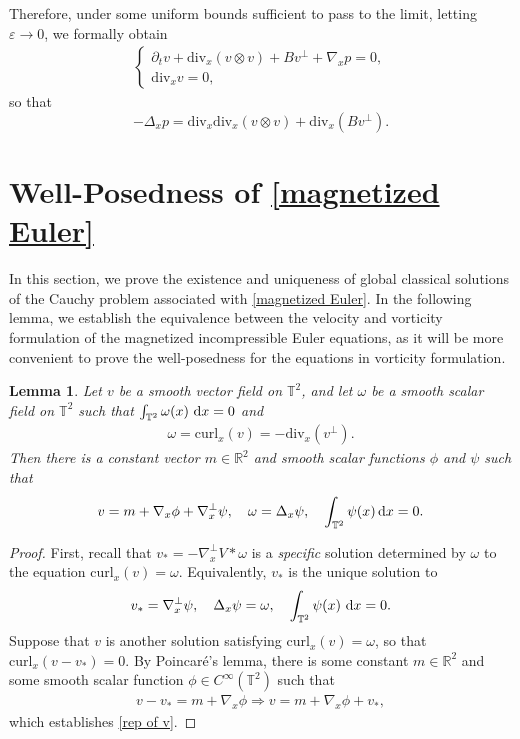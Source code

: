 \documentclass[11pt,reqno]{amsart}
\newtheorem{lem}[thm]{Lemma}
\numberwithin{equation}{section}
\def\dd{{\rm d}}
\begin{document}
Therefore, under some uniform bounds sufficient to pass to the limit, 
letting $\varepsilon\rightarrow 0$, we formally obtain
\begin{align*}
\begin{cases}
\partial_{t}v+\mathrm{div}_{x}(v\otimes v)+Bv^{\perp}+\nabla_{x}p=0,\\
\mathrm{div}_{x}v=0,
\end{cases}
\end{align*}
so that
$$
-\Delta_{x} p=\mathrm{div}_{x}\mathrm{div}_{x}(v\otimes v)+\mathrm{div}_{x}(Bv^{\perp}). 
$$

\smallskip
\section{Well-Posedness of \eqref{magnetized Euler}}\label{sec well posedness}

In this section, we prove the existence and uniqueness of global classical solutions 
of the Cauchy problem associated with \eqref{magnetized Euler}. 
In the following lemma, we establish the equivalence between the velocity and vorticity formulation 
of the magnetized incompressible Euler equations, 
as it will be more convenient to prove the well-posedness for the equations 
in vorticity formulation. 

\begin{lem} \label{Hodge decomposition lemma}
Let $v$ be a smooth vector field on $\mathbb{T}^{2}$, 
and let $\omega $ be a smooth scalar field on $\mathbb{T}^{2}$ 
such that $\int_{\mathbb{T}^{2}}\omega(x)\ \dd x=0$ and 
\begin{align*}
\omega=\mathrm{curl}_{x}(v)=-\mathrm{div}_{x}(v^{\perp}).     
\end{align*}
Then there is a constant vector $m\in \mathbb{R}^{2}$ and smooth scalar functions $\phi$ and $\psi$
such that 
\begin{equation}\label{rep of v}
v=m+\nabla_{x}\phi+\nabla_{x}^{\perp}\psi, \quad \omega=\Delta_{x}\psi,
\quad \int_{\mathbb{T}^{2}}\psi(x)\, \dd x=0.  
\end{equation}
\end{lem}

\begin{proof}
First, recall that $v_{\ast}=-\nabla_{x}^{\perp}V\ast \omega$ 
is a \textit{specific} solution determined by $\omega$ 
to the equation $\mathrm{curl}_{x}(v)=\omega$. 
Equivalently,   $v_{\ast}$ is the unique solution to 
\begin{align*}
v_{\ast}=\nabla_{x}^{\perp}\psi, \quad \Delta_{x} \psi=\omega, 
\quad \int_{\mathbb{T}^{2}}\psi(x)\ \dd x=0.      
\end{align*}
Suppose that $v$ is another solution satisfying  $\mathrm{curl}_{x}(v)=\omega$,  
so that $\mathrm{curl}_{x}(v-v_{\ast})=0$. 
By Poincar\'e's lemma, there is some constant $m\in \mathbb{R}^{2}$ and some 
smooth  scalar function $\phi\in C^{\infty}
(\mathbb{T}^{2})$ such that 
\begin{align*}
v-v_{\ast}=m+\nabla_{x}\phi\Rightarrow v=m+\nabla_{x}\phi+v_{\ast},     
\end{align*}
which establishes \eqref{rep of v}. 
\end{proof}
\end{document}
